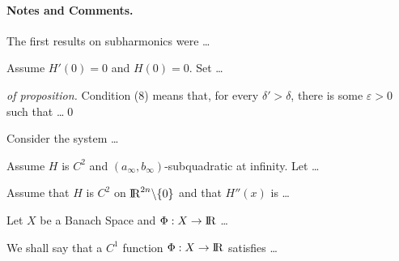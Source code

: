 \documentclass{llncs}
\begin{document}
\paragraph{Notes and Comments.}
The first results on subharmonics were \dots
%
\begin{proposition}
Assume $H'(0)=0$ and $ H(0)=0$. Set \dots
\end{proposition}
\begin{proof}[of proposition]
Condition (8) means that, for every $\delta'>\delta$, there is
some $\varepsilon>0$ such that \dots \qed
\end{proof}
%
\begin{example}
Consider the system \dots
\end{example}
\begin{corollary}
Assume $H$ is $C^{2}$ and
$\left(a_{\infty}, b_{\infty}\right)$-subquadratic
at infinity. Let \dots
\end{corollary}
\begin{lemma}
Assume that $H$ is $C^{2}$ on ${\rm I\!R}^{2n}\backslash \{0\}$
and that $H''(x)$ is \dots
\end{lemma}
\begin{theorem}
Let $X$ be a Banach Space and $\Phi:X\to{\rm I\!R}$ \dots
\end{theorem}
\begin{definition}
We shall say that a $C^{1}$ function $\Phi:X\to{\rm I\!R}$
satisfies \dots
\end{definition}
\end{document}

